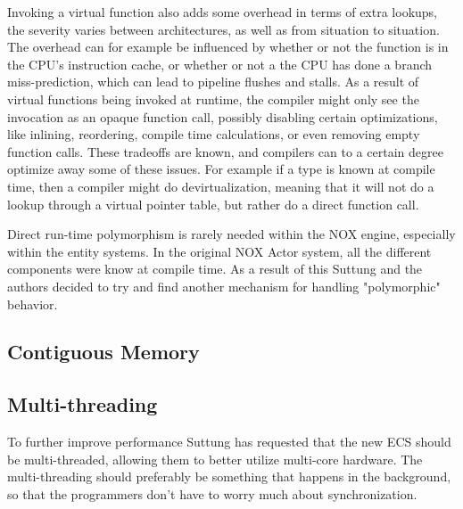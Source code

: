 Invoking a virtual function also adds some overhead in terms of extra lookups, the severity varies between architectures,
as well as from situation to situation.
The overhead can for example be influenced by whether or not the function is in the CPU's instruction cache,
or whether or not a the CPU has done a branch miss-prediction, which can lead to pipeline flushes and stalls. \cite{scott_meyers_cpu_caches_and_why_you_care} \cite[Data Locality]{game_programming_patterns}
As a result of virtual functions being invoked at runtime, the compiler might only see the invocation as an opaque function call,
possibly disabling certain optimizations, like inlining, reordering, compile time calculations, or even removing empty function calls.
These tradeoffs are known, and compilers can to a certain degree optimize away some of these issues.
For example if a type is known at compile time, then a compiler might do devirtualization,
meaning that it will not do a lookup through a virtual pointer table, but rather do a direct function call. \cite{lazarenko_devirtualization}

Direct run-time polymorphism is rarely needed within the NOX engine, especially within the entity systems.
In the original NOX Actor system, all the different components were know at compile time.
As a result of this Suttung and the authors decided to try and find another mechanism for handling "polymorphic" behavior.

\subsection{Contiguous Memory}

\subsection{Multi-threading}
To further improve performance Suttung has requested that the new ECS should be multi-threaded, allowing them to better utilize multi-core hardware.
The multi-threading should preferably be something that happens in the background, so that the programmers don't have to worry much about synchronization.
